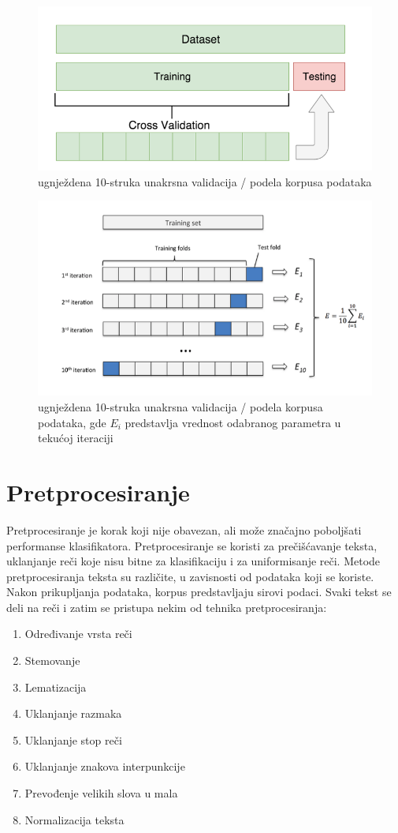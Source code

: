 \documentclass[12pt,oneside]{memoir}
\begin{document}
\begin{figure}[h!]
\centering
\includegraphics[width=.7\textwidth]{images/corss1.png}
\caption{ugnježdena 10-struka unakrsna validacija / podela korpusa podataka}
\label{img:corss1}
\end{figure}

\begin{figure}[h!]
\centering
\includegraphics[width=.7\textwidth]{images/corss2.png}
\caption{ugnježdena 10-struka unakrsna validacija / podela korpusa podataka, gde $E_i$ predstavlja vrednost odabranog parametra u tekućoj iteraciji}
\label{img:corss2}
\end{figure}

\section{Pretprocesiranje}
 
Pretprocesiranje je korak koji nije obavezan, ali može značajno poboljšati performanse klasifikatora. Pretprocesiranje se koristi za prečišćavanje teksta, uklanjanje reči koje nisu bitne za klasifikaciju i za uniformisanje reči. 
\newpage
Metode pretprocesiranja teksta su različite, u zavisnosti od podataka koji se koriste. Nakon prikupljanja podataka, korpus predstavljaju sirovi podaci. Svaki tekst se deli na reči i zatim se pristupa nekim od tehnika pretprocesiranja:
\begin{enumerate}
\item Određivanje vrsta reči
\item Stemovanje
\item Lematizacija
\item Uklanjanje razmaka
\item Uklanjanje stop reči
\item Uklanjanje znakova interpunkcije
\item Prevođenje velikih slova u mala
\item Normalizacija teksta
\end{enumerate}
\end{document}
